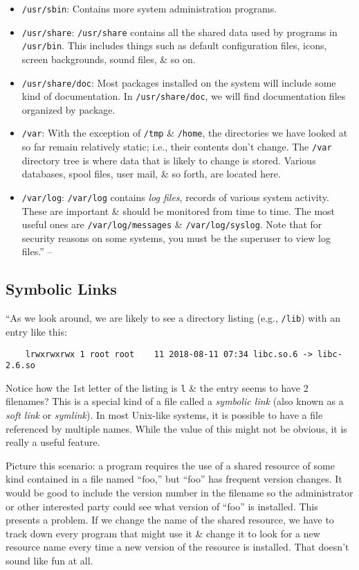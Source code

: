 \documentclass[oneside]{book}
\numberwithin{equation}{section}
\begin{document}
\begin{itemize}
	\item \texttt{/usr/sbin}: Contains more system administration programs.
	\item \texttt{/usr/share}: \texttt{/usr/share} contains all the shared data used by programs in \texttt{/usr/bin}. This includes things such as default configuration files, icons, screen backgrounds, sound files, \& so on.
	\item \texttt{/usr/share/doc}: Most packages installed on the system will include some kind of documentation. In \texttt{/usr/share/doc}, we will find documentation files organized by package.
	\item \texttt{/var}: With the exception of \texttt{/tmp} \& \texttt{/home}, the directories we have looked at so far remain relatively static; i.e., their contents don't change. The \texttt{/var} directory tree is where data that is likely to change is stored. Various databases, spool files, user mail, \& so forth, are located here.
	\item \texttt{/var/log}: \texttt{/var/log} contains \textit{log files}, records of various system activity. These are important \& should be monitored from time to time. The most useful ones are \texttt{/var/log/messages} \& \texttt{/var/log/syslog}. Note that for security reasons on some systems, you must be the superuser to view log files.'' -- \cite[pp. 57--61]{Shotts2019}
\end{itemize} 

\subsection{Symbolic Links}
``As we look around, we are likely to see a directory listing (e.g., \texttt{/lib}) with an entry like this:
\begin{verbatim}
	lrwxrwxrwx 1 root root    11 2018-08-11 07:34 libc.so.6 -> libc-2.6.so
\end{verbatim}
Notice how the 1st letter of the listing is \texttt{l} \& the entry seems to have 2 filenames? This is a special kind of a file called a \textit{symbolic link} (also known as a \textit{soft link} or \textit{symlink}). In most Unix-like systems, it is possible to have a file referenced by multiple names. While the value of this might not be obvious, it is really a useful feature.

Picture this scenario: a program requires the use of a shared resource of some kind contained in a file named ``foo,'' but ``foo'' has frequent version changes. It would be good to include the version number in the filename so the administrator or other interested party could see what version of ``foo'' is installed. This presents a problem. If we change the name of the shared resource, we have to track down every program that might use it \& change it to look for a new resource name every time a new version of the resource is installed. That doesn't sound like fun at all.
\end{document}
